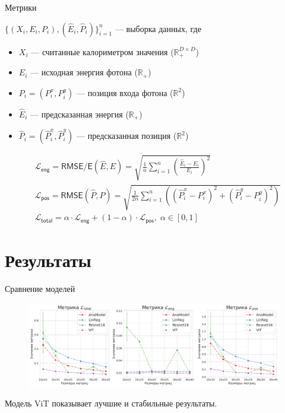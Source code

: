 \documentclass[9pt]{beamer}
\begin{document}
\begin{frame}{Метрики}
    \begin{block}{}
        $\{(X_i, E_i, P_i), (\widehat{E}_i, \widehat{P}_i) \}_{i = 1}^{n}$ --- выборка данных, где \begin{itemize}
            \item $X_i$ --- считанные калориметром значения ($\mathbb{R}_{+}^{D \times D}$)
            \item $E_i$ --- исходная энергия фотона ($\mathbb{R}_{+}$)
            \item $P_i = (P_i^x, P_i^y)$ --- позиция входа фотона ($\mathbb{R}^2$)
            \item $\widehat{E}_i$ --- предсказанная энергия ($\mathbb{R}_{+}$)
            \item $\widehat{P}_i = (\widehat{P}_i^x, \widehat{P}_i^y)$ --- предсказанная позиция ($\mathbb{R}^2$)
        \end{itemize}
    \end{block}

    \begin{block}{}
        \begin{align*}
            &\mathcal{L}_{\mathsf{eng}} = \textsf{RMSE/E}(\widehat{E}, E) = \sqrt{\frac{1}{n} \sum_{i = 1}^{n} \left( \frac{\widehat{E}_i - E_i}{E_i} \right)^2} \\
            &\mathcal{L}_{\mathsf{pos}} = \textsf{RMSE}(\widehat{P}, P) = \sqrt{\frac{1}{2 n} \sum_{i = 1}^{n} \left( (\widehat{P}_i^x - P_i^x)^2 + (\widehat{P}_i^y - P_i^y)^2 \right)} \\
            &\mathcal{L}_{\mathsf{total}} = \alpha \cdot \mathcal{L}_{\mathsf{eng}} + (1 - \alpha) \cdot \mathcal{L}_{\mathsf{pos}} , \; \alpha \in [0, 1]
        \end{align*}
    \end{block}
\end{frame}

\section{Результаты}

\begin{frame}{Сравнение моделей}
    \begin{figure}
        \centering
        \includegraphics[width=1.0\textwidth]{../report/graphics/models_comp_right.png}
    \end{figure}

    \begin{block}{}
        Модель ViT показывает лучшие и стабильные результаты.
    \end{block}
\end{frame}
\end{document}
